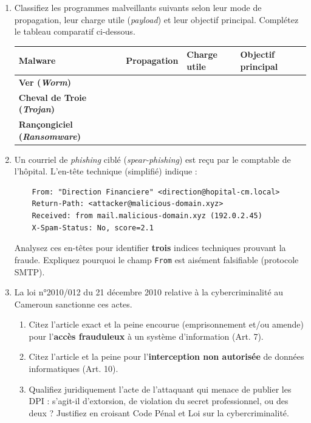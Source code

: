 \documentclass[11pt]{article}
\begin{document}
\begin{exercice}
\label{exo:malware_law}
\begin{enumerate}
    \item Classifiez les programmes malveillants suivants selon leur mode de propagation, leur charge utile (\textit{payload}) et leur objectif principal. Complétez le tableau comparatif ci-dessous.
    \begin{center}
    \begin{tabular}{|>{\bfseries}l|p{3.5cm}|p{3.5cm}|p{3.5cm}|}
    \hline
    \textbf{Malware} & \textbf{Propagation} & \textbf{Charge utile} & \textbf{Objectif principal} \\
    \hline
    Ver (\textit{Worm}) & & & \\
    \hline
    Cheval de Troie (\textit{Trojan}) & & & \\
    \hline
    Rançongiciel (\textit{Ransomware}) & & & \\
    \hline
    \end{tabular}
    \end{center}
    \item Un courriel de \textit{phishing} ciblé (\textit{spear-phishing}) est reçu par le comptable de l'hôpital. L'en-tête technique (simplifié) indique :
    \begin{verbatim}
    From: "Direction Financiere" <direction@hopital-cm.local>
    Return-Path: <attacker@malicious-domain.xyz>
    Received: from mail.malicious-domain.xyz (192.0.2.45)
    X-Spam-Status: No, score=2.1
    \end{verbatim}
    Analysez ces en-têtes pour identifier \textbf{trois} indices techniques prouvant la fraude. Expliquez pourquoi le champ \texttt{From} est aisément falsifiable (protocole SMTP).
    \item La loi n°2010/012 du 21 décembre 2010 relative à la cybercriminalité au Cameroun sanctionne ces actes.
        \begin{enumerate}
            \item Citez l'article exact et la peine encourue (emprisonnement et/ou amende) pour l'\textbf{accès frauduleux} à un système d'information (Art. 7).
            \item Citez l'article et la peine pour l'\textbf{interception non autorisée} de données informatiques (Art. 10).
            \item Qualifiez juridiquement l'acte de l'attaquant qui menace de publier les DPI : s'agit-il d'extorsion, de violation du secret professionnel, ou des deux ? Justifiez en croisant Code Pénal et Loi sur la cybercriminalité.
        \end{enumerate}
\end{enumerate}
\end{exercice}
\end{document}
